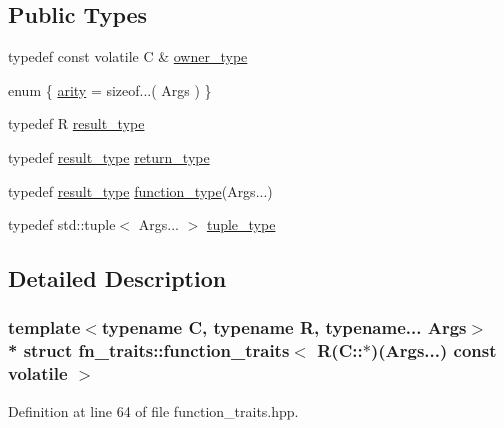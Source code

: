 \subsection*{Public Types}
\begin{DoxyCompactItemize}
\item 
typedef const volatile C \& \hyperlink{structfn__traits_1_1function__traits_3_01_r_07_c_1_1_5_08_07_args_8_8_8_08_01const_01volatile_01_4_ac9e0f1043d2bd54c554f14e2a05dfa0c}{owner\+\_\+type}
\item 
enum \{ \hyperlink{structfn__traits_1_1function__traits_3_01_r_07_args_8_8_8_08_4_aafde9521d9646c97b984646d8273dd3ba2f612b5524050ab8d6ab3d54d52dbbb0}{arity} = sizeof...( Args )
 \}
\item 
typedef R \hyperlink{structfn__traits_1_1function__traits_3_01_r_07_args_8_8_8_08_4_a1b509243ed1b4707465625de10e6c6bb}{result\+\_\+type}
\item 
typedef \hyperlink{structfn__traits_1_1function__traits_3_01_r_07_args_8_8_8_08_4_a1b509243ed1b4707465625de10e6c6bb}{result\+\_\+type} \hyperlink{structfn__traits_1_1function__traits_3_01_r_07_args_8_8_8_08_4_adf6a35a9b703dfb4778e59f132e00a9b}{return\+\_\+type}
\item 
typedef \hyperlink{structfn__traits_1_1function__traits_3_01_r_07_args_8_8_8_08_4_a1b509243ed1b4707465625de10e6c6bb}{result\+\_\+type} \hyperlink{structfn__traits_1_1function__traits_3_01_r_07_args_8_8_8_08_4_a85e5883a1c8050fe442c1072386b2d11}{function\+\_\+type}(Args...)
\item 
typedef std\+::tuple$<$ Args... $>$ \hyperlink{structfn__traits_1_1function__traits_3_01_r_07_args_8_8_8_08_4_a9b60ae8c79e52addf352e4ae7c8077b4}{tuple\+\_\+type}
\end{DoxyCompactItemize}


\subsection{Detailed Description}
\subsubsection*{template$<$typename C, typename R, typename... Args$>$\\*
struct fn\+\_\+traits\+::function\+\_\+traits$<$ R(\+C\+::$\ast$)(\+Args...) const volatile $>$}



Definition at line 64 of file function\+\_\+traits.\+hpp.



